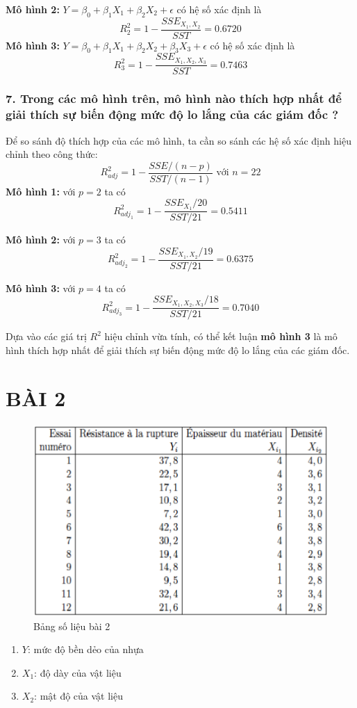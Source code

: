 \documentclass[a4paper]{article}
\theoremstyle{nonumberplain}
\begin{document}
\textbf{Mô hình 2:} $Y = \beta_0 + \beta_1 X_1 + \beta_2 X_2 + \epsilon $ có hệ số xác định là
$$R^2_2 = 1 - \displaystyle \frac{SSE_{X_1,X_2}}{SST} = 0.6720$$
\textbf{Mô hình 3:} $Y = \beta_0 + \beta_1 X_1 + \beta_2 X_2 + \beta_3 X_3 + \epsilon $ có hệ số xác định là
$$R^2_3 = 1 - \displaystyle \frac{SSE_{X_1,X_2,X_3}}{SST} = 0.7463$$



\subsubsection*{7. Trong các mô hình trên, mô hình nào thích hợp nhất để giải thích sự biến động mức độ lo lắng của các giám đốc ?}
Để so sánh độ thích hợp của các mô hình, ta cần so sánh các hệ số xác định hiệu chỉnh theo công thức:
$$R^2_{adj} = 1 - \displaystyle \frac{SSE/(n-p)}{SST/(n-1)} \text{ với } n = 22$$
\textbf{Mô hình 1:} với $p=2$ ta có $$R^2_{adj_1}  = 1 - \displaystyle \frac{SSE_{X_1}/20}{SST/21} = 0.5411$$ 

\textbf{Mô hình 2:} với $p=3$ ta có $$R^2_{adj_2} = 1 - \displaystyle \frac{SSE_{X_1,X_2}/19}{SST/21} = 0.6375$$

\textbf{Mô hình 3:} với $p=4$ ta có $$R^2_{adj_3} = 1 - \displaystyle \frac{SSE_{X_1,X_2,X_3}/18}{SST/21} = 0.7040$$

Dựa vào các giá trị $R^2$ hiệu chỉnh vừa tính, có thể kết luận \textbf{mô hình 3} là mô hình thích hợp nhất để giải thích sự biến động mức độ lo lắng của các giám đốc.
\newpage
\section*{BÀI 2}

\begin{figure}[h!]
	\centering
	\includegraphics[width=0.6\linewidth]{bai-2-data}
	\caption{Bảng số liệu bài 2}
	\label{fig:bai-2-data}
\end{figure}

\begin{enumerate}[-]
	\item $Y$: mức độ bền dẻo của nhựa
	\item $X_1$: độ dày của vật liệu
	\item $X_2$: mật độ của vật liệu
\end{enumerate}
\end{document}

